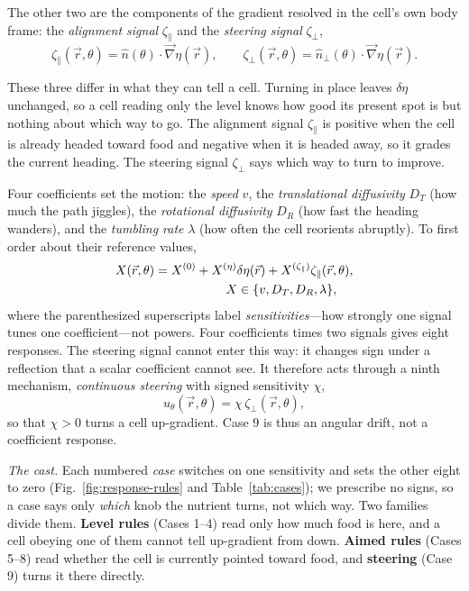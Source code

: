 \documentclass[
  reprint,
  superscriptaddress,
  amsmath,
  amssymb,
  aps,
  pre,
  nofootinbib,
  floatfix
]{revtex4-2}
\newcommand{\rv}{\vec r}
\newcommand{\ev}{\hat{n}}
\newcommand{\evp}{\hat{n}_{\perp}}
\newcommand{\grad}{\vec{\nabla}}
\newcommand{\zp}{\zeta_\parallel}
\begin{document}
The other two are the components of the gradient resolved in the cell's own
body frame: the \emph{alignment signal} $\zp$ and the \emph{steering signal} $\zeta_\perp$,
\begin{equation}
  \zp(\rv,\theta)=\ev(\theta)\cdot\grad\eta(\rv),
  \qquad
  \zeta_\perp(\rv,\theta)=\evp(\theta)\cdot\grad\eta(\rv).
  \label{eq:signals}
\end{equation}

These three differ in what they can tell a cell.  Turning in place leaves
$\delta\eta$ unchanged, so a cell reading only the level knows how good its
present spot is but nothing about which way to go.  The alignment signal $\zp$
is positive when the cell is already headed toward food and negative when it
is headed away, so it grades the current heading.  The steering signal
$\zeta_\perp$ says which way to turn to improve.

Four coefficients set the motion: the \emph{speed} $v$, the
\emph{translational diffusivity} $D_T$ (how much the path jiggles), the
\emph{rotational diffusivity} $D_R$ (how fast the heading wanders), and the
\emph{tumbling rate} $\lambda$ (how often the cell reorients abruptly).  To
first order about their reference values,
\begin{equation}
\begin{split}
  X(\rv,\theta)&=X^{(0)}+X^{(\eta)}\delta\eta(\rv)
  +X^{(\zp)}\zp(\rv,\theta),\\
  &\hspace{20mm}X\in\{v,D_T,D_R,\lambda\},
\end{split}
  \label{eq:response}
\end{equation}
where the parenthesized superscripts label \emph{sensitivities}---how
strongly one signal tunes one coefficient---not powers.  Four coefficients
times two signals gives eight responses.  The steering signal cannot enter
this way: it changes sign under a reflection that a scalar coefficient cannot
see.  It therefore acts through a ninth mechanism, \emph{continuous steering} with signed sensitivity $\chi$,
\begin{equation}
  u_\theta(\rv,\theta)=\chi\,\zeta_\perp(\rv,\theta),
  \label{eq:steering-rate}
\end{equation}
so that $\chi>0$ turns a cell up-gradient.  Case 9 is thus an angular drift,
not a coefficient response.

\emph{The cast.}  Each numbered \emph{case} switches on one sensitivity and
sets the other eight to zero (Fig.~\ref{fig:response-rules} and
Table~\ref{tab:cases}); we prescribe no signs, so a case says only \emph{which}
knob the nutrient turns, not which way.  Two families divide them.
\textbf{Level rules} (Cases 1--4) read only how much food is here, and a cell
obeying one of them cannot tell up-gradient from down.  \textbf{Aimed rules}
(Cases 5--8) read whether the cell is currently pointed toward food, and
\textbf{steering} (Case 9) turns it there directly.
\end{document}
